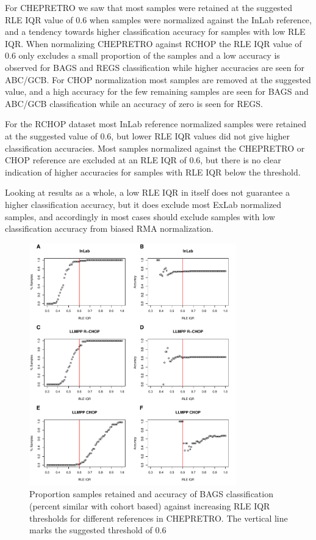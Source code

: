 For CHEPRETRO we saw that most samples were retained at the suggested RLE IQR value of 0.6 when samples were normalized against the InLab reference, and a tendency towards higher classification accuracy for samples with low RLE IQR. When normalizing CHEPRETRO against RCHOP the RLE IQR value of 0.6 only excludes a small proportion of the samples and a low accuracy is observed for BAGS and REGS classification while higher accuracies are seen for ABC/GCB. For CHOP normalization most samples are removed at the suggested value, and a high accuracy for the few remaining samples are seen for BAGS and ABC/GCB classification while an accuracy of zero is seen for REGS. 

For the RCHOP dataset most InLab reference normalized samples were retained at the suggested value of 0.6, but lower RLE IQR values did not give higher classification accuracies. Most samples normalized against the CHEPRETRO or CHOP reference are excluded at an RLE IQR of 0.6, but there is no clear indication of higher accuracies for samples with RLE IQR below the threshold.

Looking at results as a whole, a low RLE IQR in itself does not guarantee a higher classification accuracy, but it does exclude most ExLab normalized samples, and accordingly in most cases should exclude samples with low classification accuracy from biased RMA normalization.

\begin{figure}
	\begin{center}
		\includegraphics[width=0.8\textwidth]{figures/chep_rle_classification_bags.pdf}
	\end{center}
	\caption{Proportion samples retained and accuracy of BAGS classification (percent similar with cohort based) against increasing RLE IQR thresholds for different references in CHEPRETRO. The vertical line marks the suggested threshold of 0.6}
	\label{fig:chep_rle_clas_bags}
\end{figure}

